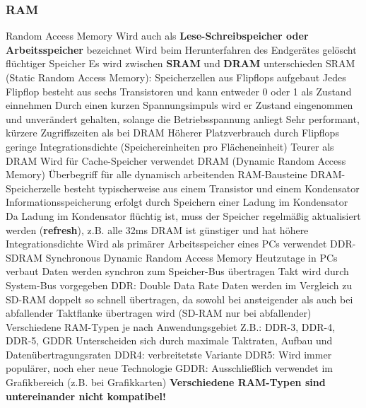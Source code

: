 \documentclass[10pt]{article}
\begin{document}
\begin{flushleft}
\subsubsection{RAM}

\begin{outline}
    \1 Random Access Memory
    \1 Wird auch als \textbf{Lese-Schreibspeicher oder Arbeitsspeicher} bezeichnet
    \1 Wird beim Herunterfahren des Endgerätes gelöscht \textrightarrow\space flüchtiger Speicher
    \1 Es wird zwischen \textbf{SRAM} und \textbf{DRAM} unterschieden	
    \1 SRAM (Static Random Access Memory):
        \2 Speicherzellen aus Flipflops aufgebaut
        \2 Jedes Flipflop besteht aus sechs Transistoren und kann entweder 0 oder 1 als Zustand einnehmen
        \2 Durch einen kurzen Spannungsimpuls wird er Zustand eingenommen und unverändert gehalten, solange die Betriebsspannung anliegt
        \2 Sehr performant, kürzere Zugriffszeiten als bei DRAM
        \2 Höherer Platzverbrauch durch Flipflops \textrightarrow\space geringe Integrationsdichte (Speichereinheiten pro Flächeneinheit)
        \2 Teurer als DRAM 
        \2 Wird für Cache-Speicher verwendet
    \1 DRAM (Dynamic Random Access Memory)
        \2 Überbegriff für alle dynamisch arbeitenden RAM-Bausteine
        \2 DRAM-Speicherzelle besteht typischerweise aus einem Transistor und einem Kondensator
        \2 Informationsspeicherung erfolgt durch Speichern einer Ladung im Kondensator
        \2 Da Ladung im Kondensator flüchtig ist, muss der Speicher regelmäßig aktualisiert werden (\textbf{refresh}), z.B. alle 32ms
        \2 DRAM ist günstiger und hat höhere Integrationsdichte
        \2 Wird als primärer Arbeitsspeicher eines PCs verwendet
    \1 DDR-SDRAM
        \2 Synchronous Dynamic Random Access Memory
        \2 Heutzutage in PCs verbaut
        \2 Daten werden synchron zum Speicher-Bus übertragen
        \2 Takt wird durch System-Bus vorgegeben
        \2 DDR: Double Data Rate \textrightarrow\space Daten werden im Vergleich zu SD-RAM doppelt so schnell übertragen, da sowohl bei ansteigender als auch bei abfallender Taktflanke übertragen wird (SD-RAM nur bei abfallender)
    \1 Verschiedene RAM-Typen je nach Anwendungsgebiet
        \2 Z.B.: DDR-3, DDR-4, DDR-5, GDDR
        \2 Unterscheiden sich durch maximale Taktraten, Aufbau und Datenübertragungsraten
        \2 DDR4: verbreitetste Variante
        \2 DDR5: Wird immer populärer, noch eher neue Technologie
        \2 GDDR: Ausschließlich verwendet im Grafikbereich (z.B. bei Grafikkarten)
        \2 \textbf{Verschiedene RAM-Typen sind untereinander nicht kompatibel!}

\end{outline}
\end{flushleft}
\end{document}
